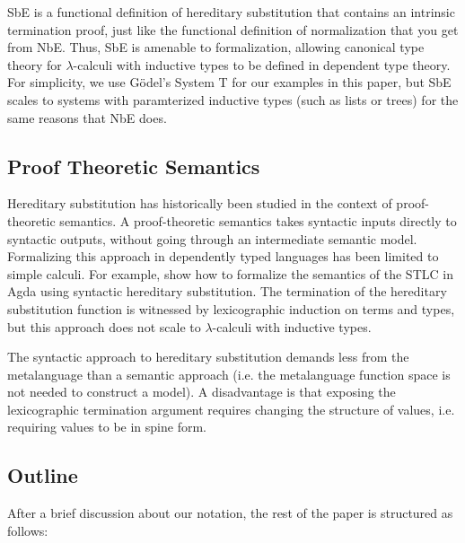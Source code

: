 \documentclass{llncs}
\begin{document}
SbE is a functional definition of hereditary substitution that
contains an intrinsic termination proof, just like the functional
definition of normalization that you get from NbE. Thus, SbE is
amenable to formalization, allowing canonical type theory for
$\lambda$-calculi with inductive types to be defined in dependent type
theory. For simplicity, we use G{\"o}del's System T for our examples
in this paper, but SbE scales to systems with paramterized inductive
types (such as lists or trees) for the same reasons that NbE does.

\subsection{Proof Theoretic Semantics}
\label{sec:proof-theoretic}

Hereditary substitution has historically been studied in the context
of proof-theoretic semantics. A proof-theoretic semantics takes
syntactic inputs directly to syntactic outputs, without going through
an intermediate semantic model. Formalizing this approach in
dependently typed languages has been limited to simple calculi.
For example, \cite{TODO} show how to formalize the
semantics of the STLC in Agda using syntactic hereditary substitution.
The termination of the hereditary substitution function is witnessed
by lexicographic induction on terms and types, but this approach does
not scale to $\lambda$-calculi with inductive types.

The syntactic approach to hereditary substitution
demands less from the metalanguage than a semantic
approach (i.e. the metalanguage
function space is not needed to construct a model). A disadvantage is
that exposing the lexicographic termination argument requires changing
the structure of values, i.e. requiring values to be in spine
form.

\subsection{Outline}

After a brief discussion about our notation, the rest of the paper is
structured as follows:
\end{document}
